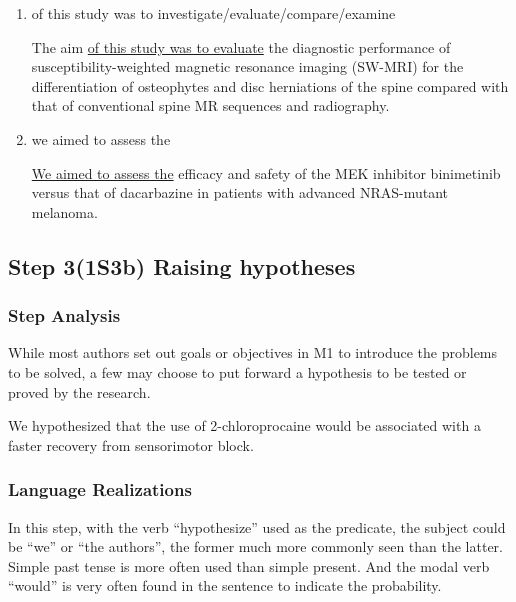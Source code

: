 \documentclass{ctexbook}
\begin{document}
\begin{enumerate}
      \item of this study was to investigate/evaluate/compare/examine
      \begin{eg}{}
        The aim \uline{of this study was to evaluate} the diagnostic performance of susceptibility-weighted magnetic resonance imaging (SW-MRI) for the differentiation of osteophytes and disc herniations of the spine compared with that of conventional spine MR sequences and radiography.
      \end{eg}

      \item we aimed to assess the
      \begin{eg}{}
        \uline{We aimed to assess the} efficacy and safety of the MEK inhibitor binimetinib versus that of dacarbazine in patients with advanced NRAS-mutant melanoma.
      \end{eg}

    \end{enumerate}

  \subsection{Step 3(1S3b) Raising hypotheses}
    
    \subsubsection{Step Analysis}

    While most authors set out goals or objectives in M1 to introduce the problems to be solved, a few may choose to put forward a hypothesis to be tested or proved by the research.

    \begin{eg}{}
      We hypothesized that the use of 2-chloroprocaine would be associated with a faster recovery from sensorimotor block.
    \end{eg}

    \subsubsection{Language Realizations}

    In this step, with the verb ``hypothesize'' used as the predicate, the subject could be ``we'' or ``the authors'', the former much more commonly seen than the latter. Simple past tense is more often used than simple present. And the modal verb ``would'' is very often found in the sentence to indicate the probability.
\end{document}
